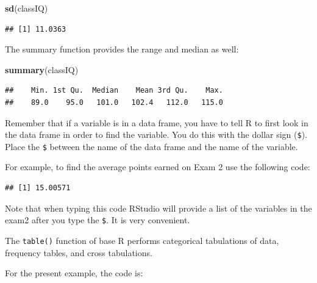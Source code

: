 \documentclass[
]{book}
\newenvironment{Shaded}{\begin{snugshade}}{\end{snugshade}}
\newcommand{\KeywordTok}[1]{\textcolor[rgb]{0.13,0.29,0.53}{\textbf{#1}}}
\newcommand{\NormalTok}[1]{#1}
\newcommand{\OperatorTok}[1]{\textcolor[rgb]{0.81,0.36,0.00}{\textbf{#1}}}
\begin{document}
\begin{Shaded}
\begin{Highlighting}[]
\KeywordTok{sd}\NormalTok{(classIQ)}
\end{Highlighting}
\end{Shaded}

\begin{verbatim}
## [1] 11.0363
\end{verbatim}

The summary function provides the range and median as well:

\begin{Shaded}
\begin{Highlighting}[]
\KeywordTok{summary}\NormalTok{(classIQ)}
\end{Highlighting}
\end{Shaded}

\begin{verbatim}
##    Min. 1st Qu.  Median    Mean 3rd Qu.    Max. 
##    89.0    95.0   101.0   102.4   112.0   115.0
\end{verbatim}

Remember that if a variable is in a data frame, you have to tell R to first look in the data frame in order to find the variable. You do this with the dollar sign (\texttt{\$}). Place the \texttt{\$} between the name of the data frame and the name of the variable.

For example, to find the average points earned on Exam 2 use the following code:

\begin{Shaded}
\end{Shaded}

\begin{verbatim}
## [1] 15.00571
\end{verbatim}

Note that when typing this code RStudio will provide a list of the variables in the exam2 after you type the \texttt{\$}. It is very convenient.

The \texttt{table()} function of base R performs categorical tabulations of data, frequency tables, and cross tabulations.

For the present example, the code is:

\begin{Shaded}
\end{Shaded}
\end{document}
